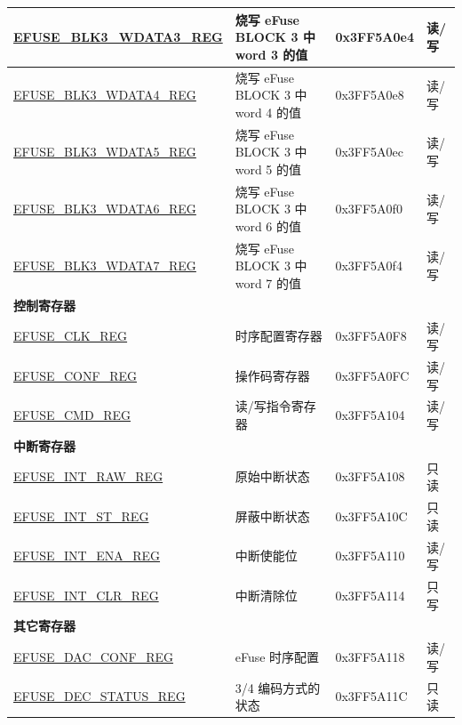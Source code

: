 \begin{longtable}{ | p{5cm} | p{7.5cm} | p{2cm} | p{1cm} | }
    \hyperref[regdesc:EFUSEBLK3WDATAnREG]{EFUSE\_BLK3\_WDATA3\_REG} & 烧写 eFuse BLOCK 3 中 word 3 的值 & 0x3FF5A0e4 & 读/写 \\ \hline
    \hyperref[regdesc:EFUSEBLK3WDATAnREG]{EFUSE\_BLK3\_WDATA4\_REG} & 烧写 eFuse BLOCK 3 中 word 4 的值 & 0x3FF5A0e8 & 读/写 \\ \hline
    \hyperref[regdesc:EFUSEBLK3WDATAnREG]{EFUSE\_BLK3\_WDATA5\_REG} & 烧写 eFuse BLOCK 3 中 word 5 的值 & 0x3FF5A0ec & 读/写 \\ \hline
    \hyperref[regdesc:EFUSEBLK3WDATAnREG]{EFUSE\_BLK3\_WDATA6\_REG} & 烧写 eFuse BLOCK 3 中 word 6 的值 & 0x3FF5A0f0 & 读/写 \\ \hline
    \hyperref[regdesc:EFUSEBLK3WDATAnREG]{EFUSE\_BLK3\_WDATA7\_REG} & 烧写 eFuse BLOCK 3 中 word 7 的值 & 0x3FF5A0f4 & 读/写 \\ \hline
    \multicolumn{4}{|l|}{\textbf{控制寄存器}} \\ \hline
    \hyperref[regdesc:EFUSECLKREG]{EFUSE\_CLK\_REG} & 时序配置寄存器 & 0x3FF5A0F8 & 读/写 \\ \hline
    \hyperref[regdesc:EFUSECONFREG]{EFUSE\_CONF\_REG} & 操作码寄存器 & 0x3FF5A0FC & 读/写 \\ \hline
    \hyperref[regdesc:EFUSECMDREG]{EFUSE\_CMD\_REG} & 读/写指令寄存器 & 0x3FF5A104 & 读/写 \\ \hline
    \multicolumn{4}{|l|}{\textbf{中断寄存器}} \\ \hline
    \hyperref[regdesc:EFUSEINTRAWREG]{EFUSE\_INT\_RAW\_REG} & 原始中断状态 & 0x3FF5A108 & 只读 \\ \hline
    \hyperref[regdesc:EFUSEINTSTREG]{EFUSE\_INT\_ST\_REG} & 屏蔽中断状态 & 0x3FF5A10C & 只读 \\ \hline
    \hyperref[regdesc:EFUSEINTENAREG]{EFUSE\_INT\_ENA\_REG} & 中断使能位 & 0x3FF5A110 & 读/写 \\ \hline
    \hyperref[regdesc:EFUSEINTCLRREG]{EFUSE\_INT\_CLR\_REG} & 中断清除位 & 0x3FF5A114 & 只写 \\ \hline
    \multicolumn{4}{|l|}{\textbf{其它寄存器}} \\ \hline
    \hyperref[regdesc:EFUSEDACCONFREG]{EFUSE\_DAC\_CONF\_REG} & eFuse 时序配置 & 0x3FF5A118 & 读/写 \\ \hline
    \hyperref[regdesc:EFUSEDECSTATUSREG]{EFUSE\_DEC\_STATUS\_REG} & 3/4 编码方式的状态 & 0x3FF5A11C & 只读 \\ \hline
    \end{longtable}
